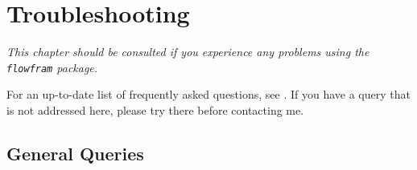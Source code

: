 \documentclass[a4paper,twoside]{book}
\newcommand{\styni}[1]{\textsf{#1}}
\newcommand{\chapdesc}[1]{%
\appenddynamiccontents*{chaphead}{\par
\emph{#1}}}
\newcommand*{\htmlnav}{}
\renewcommand{\styni}[1]{\texttt{#1}}
\renewcommand*{\chapdesc}[1]{\par\emph{#1}\par}
\newcommand*{\htmlnav}{%
\par\htmlref{Top}{top}~\textbar~\htmlref{Index}{index}}
\newcounter{I}
\begin{document}
\chapter{Troubleshooting}
\chapdesc{This chapter should be consulted if you experience any
problems using the \styni{flowfram} package.}

For an up-to-date list of frequently asked questions, see
.
If you have a query that is not addressed here, please try there
before contacting me.\htmlnav

\section{General Queries}
\end{document}
